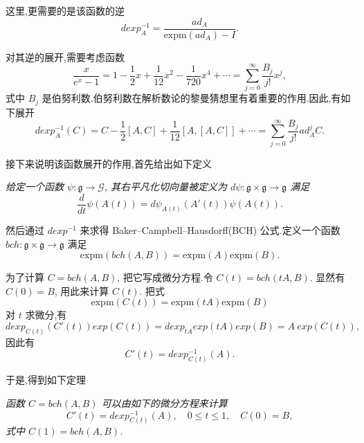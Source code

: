 这里,更需要的是该函数的逆
\begin{equation*}
	dexp_A^{-1}=\frac{ad_A}{\mbox{expm}(ad_A)-I}.
\end{equation*}

对其逆的展开,需要考虑函数
\begin{equation*}
	\frac{x}{e^x-1}=1-\frac{1}{2}x+\frac{1}{12}x^2-\frac{1}{720}x^4+\cdots=\sum_{j=0}^{\infty}\frac{B_j}{j!}x^j,
\end{equation*}
式中 $B_j$ 是伯努利数.伯努利数在解析数论的黎曼猜想里有着重要的作用.因此,有如下展开
\begin{equation*}
	dexp_A^{-1}(C)=C-\frac{1}{2}[A,C]+\frac{1}{12}[A,[A,C]]+\cdots=\sum_{j=0}^{\infty}\frac{B_j}{j!}ad^j_AC.
\end{equation*}

接下来说明该函数展开的作用,首先给出如下定义
\begin{definition}
	\emph{给定一个函数 $\psi:\mathfrak{g}\to\mathcal{G}$, 其右平凡化切向量被定义为 $d\psi:\mathfrak{g} \times \mathfrak{g} \to \mathfrak{g}$ 满足
	\begin{equation*}
		\frac{d}{dt}\psi(A(t))=d\psi_{A(t)}(A'(t))\psi(A(t)).
	\end{equation*}}
\end{definition}

然后通过 $dexp^{-1}$ 来求得 Baker–Campbell–Hausdorff(BCH) 公式.定义一个函数 $bch:\mathfrak{g} \times \mathfrak{g} \to \mathfrak{g}$ 满足
\begin{equation*}
	\mbox{expm}(bch(A,B))=\mbox{expm}(A)\mbox{expm}(B).
\end{equation*}

为了计算 $C=bch(A,B)$, 把它写成微分方程.令 $C(t)=bch(tA,B)$. 显然有 $C(0)=B$, 用此来计算 $C(t)$. 把式
\begin{equation*}
	\mbox{expm}(C(t))=\mbox{expm}(tA)\mbox{expm}(B)
\end{equation*}
对 $t$ 求微分,有
\begin{equation*}
	dexp_{C(t)}(C'(t))exp(C(t))=dexp_{tA}exp(tA)exp(B)=A~exp(C(t)),
\end{equation*}
因此有
\begin{equation*}
	C'(t)=dexp_{C(t)}^{-1}(A).
\end{equation*}

于是,得到如下定理
\begin{theorem}
	\emph{函数 $C=bch(A,B)$ 可以由如下的微分方程来计算
	\begin{equation*}
		C'(t)=dexp_{C(t)}^{-1}(A),\quad 0\leq t\leq 1,\quad C(0)=B,
	\end{equation*}
	式中 $C(1)=bch(A,B)$.}
\end{theorem}

